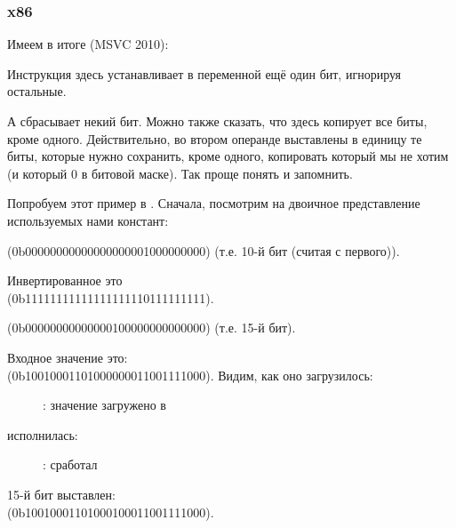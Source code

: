\subsubsection{x86}


Имеем в итоге (MSVC 2010):



Инструкция \OR здесь устанавливает в переменной ещё один бит, игнорируя остальные.

А \AND сбрасывает некий бит. Можно также сказать, что \AND здесь копирует все биты, кроме одного. 
Действительно, во втором операнде \AND выставлены в единицу те биты, которые нужно сохранить, 
кроме одного, копировать который мы не хотим (и который 0 в битовой маске).
Так проще понять и запомнить.

\clearpage
\mysubparagraph{\olly}

Попробуем этот пример в \olly.
Сначала, посмотрим на двоичное представление используемых нами констант:

 (0b0000000000000000000{\color{red}1}000000000) (т.е. 10-й бит (считая с первого)).

Инвертированное  это \\
(0b1111111111111111111{\color{red}0}111111111).

 (0b00000000000000{\color{red}1}00000000000000) (т.е. 15-й бит).

Входное значение это:  \\
(0b10010001101000000011001111000).
Видим, как оно загрузилось:

\begin{figure}[H]
\centering
{}
\caption{\olly: значение загружено в \ECX}
\label{fig:set_reset_olly1}
\end{figure}

\clearpage
\OR исполнилась:

\begin{figure}[H]
\centering
{}
\caption{\olly: \OR сработал}
\label{fig:set_reset_olly2}
\end{figure}

15-й бит выставлен: \\ 
(0b10010001101000{\color{red}1}00011001111000).

